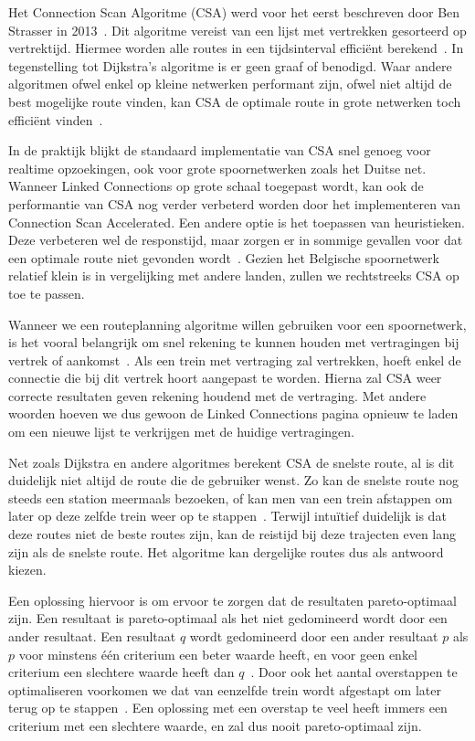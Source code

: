 Het Connection Scan Algoritme (CSA) werd voor het eerst beschreven door Ben Strasser in 2013~\citep{strasser13}. Dit algoritme vereist van een lijst met vertrekken gesorteerd op vertrektijd. Hiermee worden alle routes in een tijdsinterval efficiënt berekend~\citep{strasser14,strasser17}. In tegenstelling tot Dijkstra's algoritme is er geen graaf of  benodigd. Waar andere algoritmen ofwel enkel op kleine netwerken performant zijn, ofwel niet altijd de best mogelijke route vinden, kan CSA de optimale route in grote netwerken toch efficiënt vinden~\citep{strasser14}.

In de praktijk blijkt de standaard implementatie van CSA snel genoeg voor realtime opzoekingen, ook voor grote spoornetwerken zoals het Duitse net\citep{strasser14}. Wanneer Linked Connections op grote schaal toegepast wordt, kan ook de performantie van CSA nog verder verbeterd worden door het implementeren van Connection Scan Accelerated\citep{strasser14,strasser17}. Een andere optie is het toepassen van heuristieken. Deze verbeteren wel de responstijd, maar zorgen er in sommige gevallen voor dat een optimale route niet gevonden wordt~\citep{hannemann07}. Gezien het Belgische spoornetwerk relatief klein is in vergelijking met andere landen, zullen we rechtstreeks CSA op toe te passen. 

Wanneer we een routeplanning algoritme willen gebruiken voor een spoornetwerk, is het vooral belangrijk om snel rekening te kunnen houden met vertragingen bij vertrek of aankomst~\citep{strasser14,strasser17}. Als een trein met vertraging zal vertrekken, hoeft enkel de connectie die bij dit vertrek hoort aangepast te worden. Hierna zal CSA weer correcte resultaten geven rekening houdend met de vertraging. Met andere woorden hoeven we dus gewoon de Linked Connections pagina opnieuw te laden om een nieuwe lijst te verkrijgen met de huidige vertragingen. 

Net zoals Dijkstra en andere algoritmes berekent CSA de snelste route, al is dit duidelijk niet altijd de route die de gebruiker wenst. Zo kan de snelste route nog steeds een station meermaals bezoeken, of kan men van een trein afstappen om later op deze zelfde trein weer op te stappen~\citep{strasser14}. Terwijl intuïtief duidelijk is dat deze routes niet de beste routes zijn, kan de reistijd bij deze trajecten even lang zijn als de snelste route. Het algoritme kan dergelijke routes dus als antwoord kiezen.

Een oplossing hiervoor is om ervoor te zorgen dat de resultaten pareto-optimaal zijn. Een resultaat is pareto-optimaal als het niet gedomineerd wordt door een ander resultaat. Een resultaat $q$ wordt gedomineerd door een ander resultaat $p$ als $p$ voor minstens één criterium een beter waarde heeft, en voor geen enkel criterium een slechtere waarde heeft dan $q$~\citep{hannemann08,strasser17}. Door ook het aantal overstappen te optimaliseren voorkomen we dat van eenzelfde trein wordt afgestapt om later terug op te stappen~\citep{strasser14}. Een oplossing met een overstap te veel heeft immers een criterium met een slechtere waarde, en zal dus nooit pareto-optimaal zijn.

